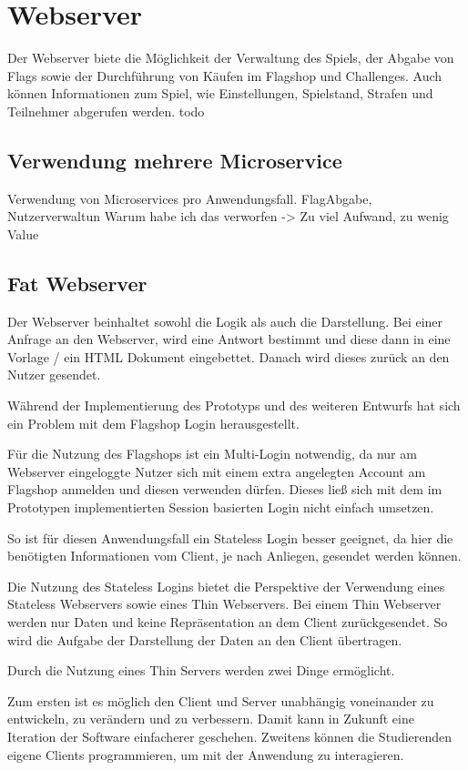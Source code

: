 \section{Webserver} \label{sec:Webserver}
Der Webserver biete die Möglichkeit der Verwaltung des Spiels, der Abgabe von Flags sowie der Durchführung von Käufen im Flagshop und Challenges. Auch können Informationen zum Spiel, wie Einstellungen, Spielstand, Strafen und Teilnehmer abgerufen werden. todo

\subsection{Verwendung mehrere Microservice}
Verwendung von Microservices pro Anwendungsfall. FlagAbgabe, Nutzerverwaltun
Warum habe ich das verworfen -> Zu viel Aufwand, zu wenig Value

\subsection{Fat Webserver}
Der Webserver beinhaltet sowohl die Logik als auch die Darstellung. Bei einer Anfrage an den Webserver, wird eine Antwort bestimmt und diese dann in eine Vorlage / ein HTML Dokument eingebettet. Danach wird dieses zurück an den Nutzer gesendet.

Während der Implementierung des Prototyps und des weiteren Entwurfs hat sich ein Problem mit dem Flagshop Login herausgestellt.

Für die Nutzung des Flagshops ist ein Multi-Login notwendig, da nur am Webserver eingeloggte Nutzer sich mit einem extra angelegten Account am Flagshop anmelden und diesen verwenden dürfen. Dieses ließ sich mit dem im Prototypen implementierten Session basierten Login nicht einfach umsetzen. 

So ist für diesen Anwendungsfall ein Stateless Login besser geeignet, da hier die benötigten Informationen vom Client, je nach Anliegen, gesendet werden können. 

Die Nutzung des Stateless Logins bietet die Perspektive der Verwendung eines Stateless Webservers sowie eines Thin Webservers. Bei einem Thin Webserver werden nur Daten und keine Repräsentation an dem Client zurückgesendet. So wird die Aufgabe der Darstellung der Daten an den Client übertragen.

Durch die Nutzung eines Thin Servers werden zwei Dinge ermöglicht. 

Zum ersten ist es möglich den Client und Server unabhängig voneinander zu entwickeln, zu verändern und zu verbessern. Damit kann in Zukunft eine Iteration der Software einfacherer geschehen. Zweitens können die Studierenden eigene Clients programmieren, um mit der Anwendung zu interagieren.


